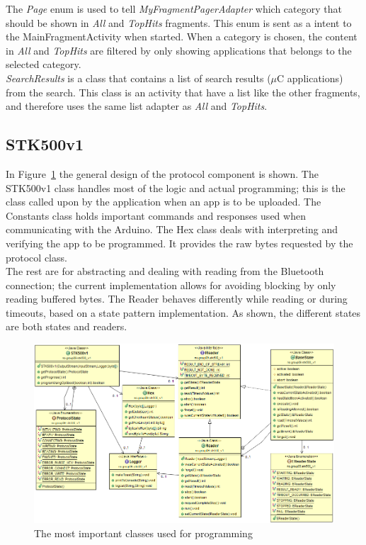 	The \textit{Page} enum is used to tell \textit{MyFragmentPagerAdapter} which category that should be shown in \textit{All} and \textit{TopHits} fragments. This enum is sent as a intent to the MainFragmentActivity when started. When a category is chosen, the content in \textit{All} and \textit{TopHits} are filtered by only showing applications that belongs to the selected category.\\

	\textit{SearchResults} is a class that contains a list of search results ($\mu$C applications) from the search. This class is an activity that have a list like the other fragments, and therefore uses the same list adapter as \textit{All} and \textit{TopHits}. 

	\subsection{STK500v1}
	In Figure~\ref{fig:stk500v1uml} the general design of the protocol component is shown. The STK500v1 class
    handles most of the logic and actual programming; this is the class called upon by the application when
    an app is to be uploaded. The Constants class holds important commands and responses used when communicating
    with the Arduino.
    The Hex class deals with interpreting and verifying the app to be programmed. It provides the raw bytes
    requested by the protocol class.\\
    
    The rest are for abstracting and dealing with reading from the Bluetooth connection; the current
    implementation allows for avoiding blocking by only reading buffered bytes. The Reader behaves differently while
    reading or during timeouts, based on a state pattern implementation. As shown, the different states are both
    states and readers.

	\begin{figure}[H]
	\hspace*{-1.0in}
	\includegraphics[scale=0.58]{images/UML/stk500v1.png}
	\caption[UML - Main GUI]{The most important classes used for programming}
	\label{fig:stk500v1uml}
	\end{figure}

